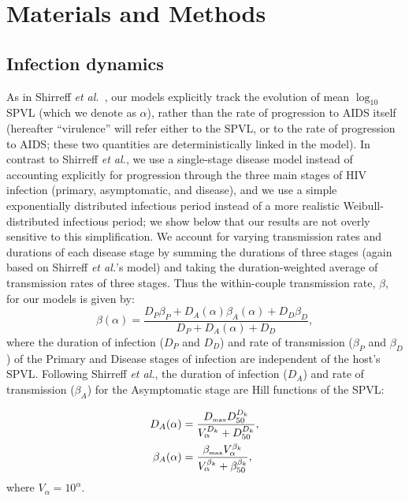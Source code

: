 \documentclass[10pt,letterpaper]{article}
\newcommand{\etal}{\textit{et al.}}
\newcommand{\tsub}[2]{#1_{{\textrm{\tiny #2}}}}
\begin{document}
\section*{Materials and Methods}

\subsection*{Infection dynamics}

As in Shirreff \etal\ \cite{shirreff_transmission_2011}, our models
explicitly track the evolution of mean $\log_{10}$ SPVL
(which we denote as $\alpha$), rather than the rate of progression to
AIDS itself (hereafter ``virulence'' will refer either to the SPVL, or
to the rate of progression to AIDS; these two quantities are
deterministically linked in the model).  
In contrast to Shirreff \etal, we use a
single-stage disease model instead of accounting explicitly for
progression through the three main stages of HIV infection (primary,
asymptomatic, and disease), and we use a simple exponentially
distributed infectious period instead of a more realistic
Weibull-distributed infectious period; we show below that our results
are not overly sensitive to this simplification. We account for
varying transmission rates and durations of each disease stage by
summing the durations of three stages (again based on Shirreff \etal's
model) and taking the duration-weighted average of transmission rates
of three stages. Thus the within-couple transmission rate, $\beta$,
for our models is given by:
\begin{equation}
\beta (\alpha) = \frac{D_P \beta_P + D_A (\alpha) \beta_A (\alpha) + D_D \beta_D}{D_P + D_A (\alpha) + D_D},
\end{equation}
where the duration of infection ($D_P$ and $D_D$) and rate of transmission ($\beta_P$ and $\beta_D$) of the Primary and Disease stages
of infection are independent of the host's SPVL. Following Shirreff \etal, the duration of infection ($D_A$) and rate of transmission ($\beta_A$) for the Asymptomatic stage are Hill functions of the SPVL:

\begin{equation}
\begin{split}
D_A(\alpha) &= \frac{\tsub{D}{max} D_{50} ^{D_k}}{V_\alpha ^{D_k} + D_{50}^{D_k}}, \\
\beta_A(\alpha) &= \frac{\tsub{\beta}{max} V_\alpha ^ {\beta_k}}%
{V_\alpha^{\beta_k} + \beta_{50} ^{\beta_k}},
\end{split}
\label{eq:hillfuns}
\end{equation}
where $V_{\alpha} = 10^\alpha$. 
\end{document}
